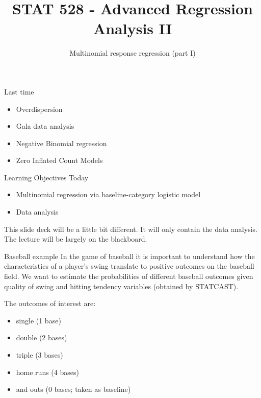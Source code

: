\documentclass[
  ignorenonframetext,
]{beamer}
\title{STAT 528 - Advanced Regression Analysis II}
\author{Multinomial response regression (part I)}
\date{}
\institute{Daniel J. Eck\\
Department of Statistics\\
University of Illinois}
\providecommand{\tightlist}{%
  \setlength{\itemsep}{0pt}\setlength{\parskip}{0pt}}
\begin{document}
\frame{\titlepage}

\begin{frame}
\newcommand{\R}{\mathbb{R}}
\newcommand{\Prob}{\mathbb{P}}
\newcommand{\Proj}{\textbf{P}}
\newcommand{\Hcal}{\mathcal{H}}
\newcommand{\rootn}{\sqrt{n}}
\newcommand{\p}{\mathbf{p}}
\newcommand{\E}{\text{E}}
\newcommand{\Var}{\text{Var}}
\newcommand{\Cov}{\text{Cov}}
\newcommand{\mubf}{\bm{\mu}}
\newcommand{\logit}{\text{logit}}

\newtheorem{cor}{Corollary}
\newtheorem{lem}{Lemma}
\newtheorem{thm}{Theorem}
\newtheorem{defn}{Definition}
\newtheorem{prop}{Proposition}
\end{frame}

\begin{frame}{Last time}
\protect\hypertarget{last-time}{}
\begin{itemize}
\tightlist
\item
  Overdispersion
\item
  Gala data analysis
\item
  Negative Binomial regression
\item
  Zero Inflated Count Models
\end{itemize}
\end{frame}

\begin{frame}{Learning Objectives Today}
\protect\hypertarget{learning-objectives-today}{}
\begin{itemize}
\tightlist
\item
  Multinomial regression via baseline-category logistic model
\item
  Data analysis
\end{itemize}

\vspace{12pt}

This slide deck will be a little bit different. It will only contain the
data analysis. The lecture will be largely on the blackboard.
\end{frame}

\begin{frame}{Baseball example}
\protect\hypertarget{baseball-example}{}
In the game of baseball it is important to understand how the
characteristics of a player's swing translate to positive outcomes on
the baseball field. We want to estimate the probabilities of different
baseball outcomes given quality of swing and hitting tendency variables
(obtained by STATCAST).

\vspace{12pt}

The outcomes of interest are:

\begin{itemize}
\tightlist
\item
  single (1 base)
\item
  double (2 bases)
\item
  triple (3 bases)
\item
  home runs (4 bases)
\item
  and outs (0 bases; taken as baseline)
\end{itemize}
\end{frame}
\end{document}

